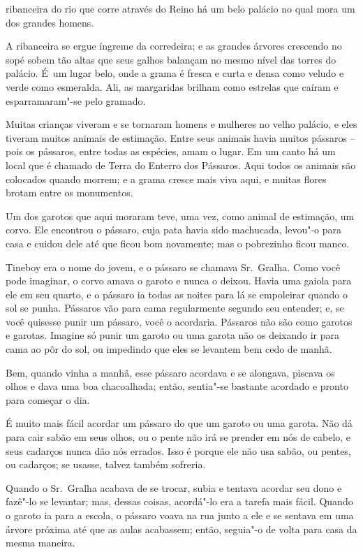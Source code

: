  

 ribanceira do rio que corre através do Reino há um belo palácio no
qual mora um dos grandes homens.

A ribanceira se ergue íngreme da corredeira; e as grandes árvores
crescendo no sopé sobem tão altas que seus galhos balançam no mesmo
nível das torres do palácio. É~um lugar belo, onde a grama é fresca e
curta e densa como veludo e verde como esmeralda. Ali, as margaridas
brilham como estrelas que caíram e esparramaram"-se pelo gramado.

Muitas crianças viveram e se tornaram homens e mulheres no velho
palácio, e eles tiveram muitos animais de estimação. Entre seus animais
havia muitos pássaros -- pois os pássaros, entre todas as espécies, amam
o lugar. Em um canto há um local que é chamado de Terra do Enterro dos
Pássaros. Aqui todos os animais são colocados quando morrem; e a grama
cresce mais viva aqui, e muitas flores brotam entre os monumentos.

Um dos garotos que aqui moraram teve, uma vez, como animal de estimação,
um corvo. Ele encontrou o pássaro, cuja pata havia sido machucada,
levou"-o para casa e cuidou dele até que ficou bom novamente; mas o
pobrezinho ficou manco.

Tineboy era o nome do jovem, e o pássaro se chamava Sr.~Gralha. Como
você pode imaginar, o corvo amava o garoto e nunca o deixou. Havia uma
gaiola para ele em seu quarto, e o pássaro ia todas as noites para lá
se empoleirar quando o sol se punha. Pássaros vão para cama regularmente
segundo seu entender; e, se você quisesse punir um pássaro, você o
acordaria. Pássaros não são como garotos e garotas. Imagine só punir um
garoto ou uma garota não os deixando ir para cama ao pôr do sol, ou
impedindo que eles se levantem bem cedo de manhã.

Bem, quando vinha a manhã, esse pássaro acordava e se alongava, piscava
os olhos e dava uma boa chacoalhada; então, sentia"-se bastante acordado e
pronto para começar o dia.

É muito mais fácil acordar um pássaro do que um garoto ou uma garota. Não dá para cair sabão em seus olhos, ou o pente não irá se prender em nós
de cabelo, e seus cadarços nunca dão nós errados. Isso é porque ele não
usa sabão, ou pentes, ou cadarços; se usasse, talvez também
sofreria.

Quando o Sr.~Gralha acabava de se trocar, subia e tentava acordar
seu dono e fazê"-lo se levantar; mas, dessas coisas, acordá"-lo era a tarefa
mais fácil. Quando o garoto ia para a escola, o pássaro voava na rua
junto a ele e se sentava em uma árvore próxima até que as aulas
acabassem; então, seguia"-o de volta para casa da mesma maneira.



